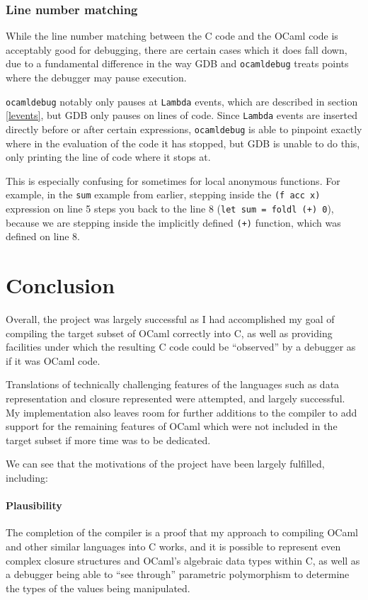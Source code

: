 \documentclass[12pt,a4paper,twoside,openright]{report}
\begin{document}
\subsection{Line number matching}

While the line number matching between the C code and the OCaml code is 
acceptably good for debugging, there are certain cases which it does fall down, 
due to a fundamental difference in the way GDB and \texttt{ocamldebug} treats 
points where the debugger may pause execution.

\texttt{ocamldebug} notably only pauses at \texttt{Lambda} events, which are 
described in section \ref{levents}, but GDB only pauses on lines of code. Since 
\texttt{Lambda} events are inserted directly before or after certain 
expressions, \texttt{ocamldebug} is able to pinpoint exactly where in the 
evaluation of the code it has stopped, but GDB is unable to do this, only 
printing the line of code where it stops at.

This is especially confusing for sometimes for local anonymous functions. For 
example, in the \texttt{sum} example from earlier, stepping inside the 
\texttt{(f acc x)} expression on line 5 steps you back to the line 8 
(\texttt{let sum = foldl (+) 0}), because we are stepping inside the implicitly 
defined \texttt{(+)} function, which was defined on line 8.

\chapter{Conclusion}

Overall, the project was largely successful as I had accomplished my goal of 
compiling the target subset of OCaml correctly into C, as well as providing 
facilities under which the resulting C code could be ``observed'' by a debugger 
as if it was OCaml code.

Translations of technically challenging features of the languages such as data 
representation and closure represented were attempted, and largely successful. 
My implementation also leaves room for further additions to the compiler to add 
support for the remaining features of OCaml which were not included in the 
target subset if more time was to be dedicated.

We can see that the motivations of the project have been largely fulfilled, 
including:

\subsubsection{Plausibility}
The completion of the compiler is a proof that my approach to compiling OCaml 
and other similar languages into C works, and it is possible to represent even 
complex closure structures and OCaml's algebraic data types within C, as well 
as a debugger being able to ``see through'' parametric polymorphism to 
determine the types of the values being manipulated.
\end{document}
